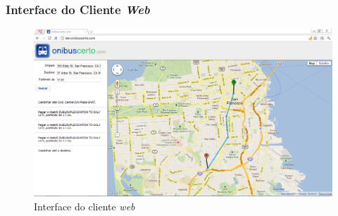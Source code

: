 \frame
{
\frametitle{Interface do Cliente \emph{Web}}
\begin{figure}
\includegraphics[width=1\textwidth]{./imgs/clienteweb.png}
\caption{Interface do cliente \emph{web}}
\end{figure}
}
